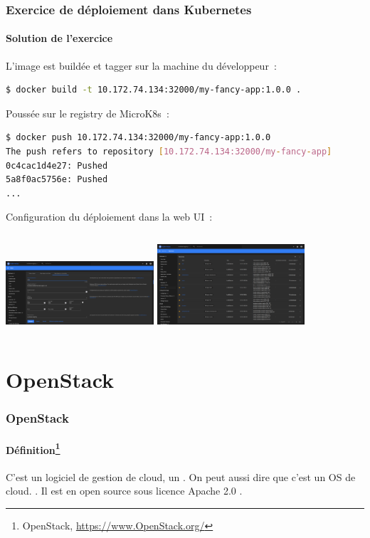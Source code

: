 \documentclass{beamer}
\begin{document}
    \begin{frame}[fragile]
        \transdissolve
        \frametitle{Exercice de déploiement dans Kubernetes}
        \framesubtitle{Solution de l'exercice}
        L'image est buildée et tagger sur la machine du développeur~:
        \begin{lstlisting}[language=bash]
$ docker build -t 10.172.74.134:32000/my-fancy-app:1.0.0 .
        \end{lstlisting}
        Poussée sur le registry de MicroK8s~:
        \begin{lstlisting}[language=bash]
$ docker push 10.172.74.134:32000/my-fancy-app:1.0.0
The push refers to repository [10.172.74.134:32000/my-fancy-app]
0c4cac1d4e27: Pushed
5a8f0ac5756e: Pushed
...
        \end{lstlisting}
        Configuration du déploiement dans la web UI~:
        \begin{columns}
            \centering
            \includegraphics[width=5.5cm]{image/k8s-deployment-configuration}
            \centering
            \includegraphics[width=5.5cm]{image/k8s-services}
        \end{columns}
    \end{frame}


    \section{OpenStack}\label{sec:openstack}

    \begin{frame}
        \transdissolve
        \frametitle{OpenStack}
        \framesubtitle{Définition\footnote{\label{OpenStackhome}OpenStack, \url{https://www.OpenStack.org/}}}
        C'est un logiciel de gestion de cloud, un .
        On peut aussi dire que c'est un OS de cloud.
        \bigbreak
        \bigbreak
        .
        \bigbreak
        \bigbreak
        Il est en open source sous licence Apache 2.0 .
    \end{frame}
\end{document}
